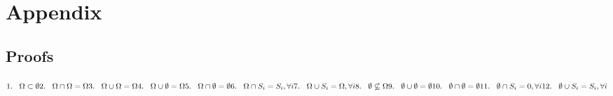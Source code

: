 \documentclass[11pt]{article}
\begin{document}
\section{Appendix}
\subsection{Proofs}
$
1. \vspace{3mm} \hspace{3mm} \Omega \subset \emptyset \\
2. \vspace{3mm} \hspace{3mm} \Omega \cap \Omega = \Omega \\
3. \vspace{3mm} \hspace{3mm} \Omega \cup \Omega = \Omega \\
4. \vspace{3mm} \hspace{3mm} \Omega \cup \emptyset = \Omega \\
5. \vspace{3mm} \hspace{3mm} \Omega \cap \emptyset = \emptyset \\
6. \vspace{3mm} \hspace{3mm} \Omega \cap  S_i = S_i, \forall i\\
7. \vspace{3mm} \hspace{3mm} \Omega \cup S_i = \Omega, \forall i \\
8. \vspace{3mm} \hspace{3mm} \emptyset \not\subseteq \Omega \\
9. \vspace{3mm} \hspace{3mm} \emptyset \cup \emptyset = \emptyset \\
10. \vspace{3mm} \hspace{3mm} \emptyset \cap \emptyset = \emptyset \\
11. \vspace{3mm} \hspace{3mm} \emptyset \cap  S_i = 0, \forall i \\
12. \vspace{3mm} \hspace{3mm} \emptyset \cup S_i = S_i, \forall i \\
$
\end{document}
